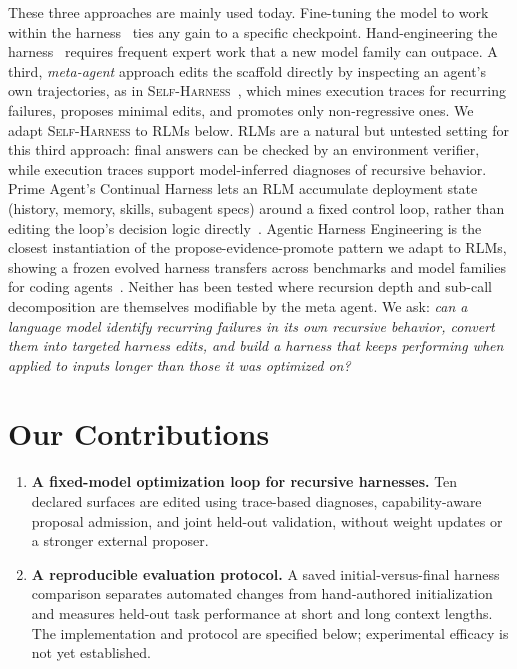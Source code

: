 \documentclass{article}
\newcommand{\rlms}{\textsc{RLM}s\xspace}
\newcommand{\sh}{\textsc{Self-Harness}\xspace}
\begin{document}
These three approaches are mainly used today.
Fine-tuning the model to work within the
harness~\citep{zhang2026harness,yang2026recursive} ties any gain to a specific checkpoint.
Hand-engineering the harness~\citep{alizadeh2026srlm,roy2026ycombinator,lumer2026rah} requires
frequent expert work that a new model family can outpace.
A third, \emph{meta-agent} approach edits the scaffold directly by inspecting an agent's own trajectories, as in \sh{}~\citep{zhang2026selfharness}, which mines execution traces for recurring failures, proposes minimal edits, and promotes only non-regressive ones. We adapt \sh{} to \rlms below. \rlms are a natural but untested setting for this third approach: final answers can be checked by an environment verifier, while execution traces support model-inferred diagnoses of recursive behavior.
Prime Agent's Continual Harness lets an RLM accumulate deployment state (history, memory, skills, subagent specs) around a fixed control loop, rather than editing the loop's decision logic directly~\citep{karten2026primeagent}.
Agentic Harness Engineering is the closest
instantiation of the propose-evidence-promote pattern we adapt to RLMs, showing a frozen
evolved harness transfers across benchmarks and model families for coding
agents~\citep{lin2026agenticharness}. Neither has been tested where recursion depth and
sub-call decomposition are themselves modifiable by the meta agent.
We ask: \emph{can a language model
identify recurring failures in its own recursive behavior, convert them into targeted harness
edits, and build a harness that keeps performing when applied to inputs longer than those it was optimized on?}

\section{Our Contributions}

\begin{enumerate}
\setlength{\itemsep}{1pt}
\setlength{\topsep}{2pt}
\setlength{\parskip}{0pt}
\item \textbf{A fixed-model optimization loop for recursive harnesses.}
Ten declared surfaces are edited using trace-based diagnoses, capability-aware
proposal admission, and joint held-out validation, without weight updates or a
stronger external proposer.
\item \textbf{A reproducible evaluation protocol.}
A saved initial-versus-final harness comparison separates automated changes from
hand-authored initialization and measures held-out task performance at short and
long context lengths. The implementation and protocol are specified below;
experimental efficacy is not yet established.
\end{enumerate}
\end{document}
